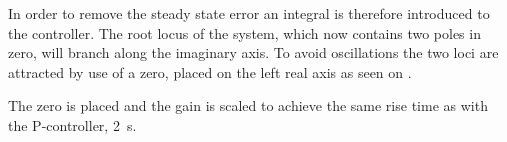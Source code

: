 
In order to remove the steady state error an integral is therefore introduced to the controller. The root locus of the system, which now contains two poles in zero, will branch along the imaginary axis. To avoid oscillations the two loci are attracted by use of a zero, placed on the left real axis as seen on .


The zero is placed and the gain is scaled to achieve the same rise time as with the P-controller, \SI{2}{s}.


